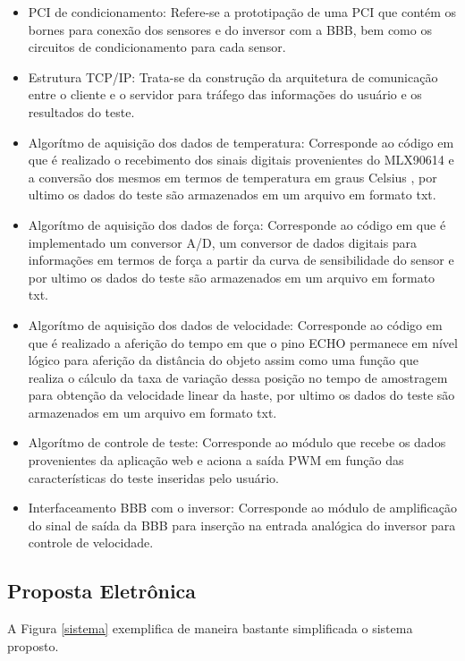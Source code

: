 	\begin{itemize}

	\item PCI de condicionamento: Refere-se a prototipação de uma PCI que contém os bornes para conexão dos sensores e do inversor com a BBB, bem como os circuitos de condicionamento para cada sensor.
	\item Estrutura TCP/IP: Trata-se da construção da arquitetura de comunicação entre o cliente e o servidor para tráfego das informações do usuário e os resultados do teste.
	\item Algorítmo de aquisição dos dados de temperatura: Corresponde ao código em que é realizado o recebimento dos sinais digitais provenientes do MLX90614 e a conversão dos mesmos em termos de temperatura em graus Celsius , por ultimo os dados do teste são armazenados em um arquivo em formato txt.
	\item Algorítmo de aquisição dos dados de força: Corresponde ao código em que é implementado um conversor A/D, um conversor de dados digitais para informações em termos de força a partir da curva de sensibilidade do sensor e por ultimo os dados do teste são armazenados em um arquivo em formato txt.
	\item Algorítmo de aquisição dos dados de velocidade: Corresponde ao código em que é realizado a aferição do tempo em que o pino ECHO permanece em nível lógico para aferição da distância do objeto assim como uma função que realiza o cálculo da taxa de variação dessa posição no tempo de amostragem para obtenção da velocidade linear da haste, por ultimo os dados do teste são armazenados em um arquivo em formato txt.
	\item Algorítmo de controle de teste: Corresponde ao módulo que recebe os dados provenientes da aplicação web e aciona a saída PWM em função das características do teste inseridas pelo usuário.
	\item Interfaceamento BBB com o inversor: Corresponde ao módulo de amplificação do sinal de saída da BBB para inserção na entrada analógica do inversor para controle de velocidade.
	\end{itemize}

\newpage
\subsection{Proposta Eletrônica}

	A Figura \ref{sistema} exemplifica de maneira bastante simplificada o sistema proposto.

